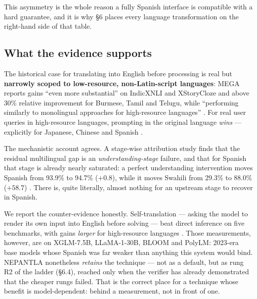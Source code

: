 This asymmetry is the whole reason a fully Spanish interface is compatible with a
hard guarantee, and it is why \S6 places every language transformation on the
right-hand side of that table.

\subsection{What the evidence supports}
\label{sec:evidence-upstream}

The historical case for translating into English before processing is real but
\textbf{narrowly scoped to low-resource, non-Latin-script languages}: MEGA
reports gains ``even more substantial'' on IndicXNLI and XStoryCloze and above
30\% relative improvement for Burmese, Tamil and Telugu, while ``performing
similarly to monolingual approaches for high-resource languages''
\citep{ahuja2023mega}. For real user queries in high-resource languages,
prompting in the original language \emph{wins} --- explicitly for Japanese,
Chinese and Spanish \citep{liu2024translationall}.

The mechanistic account agrees. A stage-wise attribution study finds that the
residual multilingual gap is an \emph{understanding-stage} failure, and that for
Spanish that stage is already nearly saturated: a perfect understanding
intervention moves Spanish from 93.9\% to 94.7\% ($+0.8$), while it moves Swahili
from 29.3\% to 88.0\% ($+58.7$) \citep{kang2026whygaps}. There is, quite
literally, almost nothing for an upstream stage to recover in Spanish.

We report the counter-evidence honestly. Self-translation --- asking the model to
render its own input into English before solving --- beat direct inference on
five benchmarks, with gains \emph{larger} for high-resource languages
\citep{etxaniz2024selftranslate}. Those measurements, however, are on
XGLM-7.5B, LLaMA-1-30B, BLOOM and PolyLM: 2023-era base models whose Spanish was
far weaker than anything this system would bind. NEPANTLA nonetheless
\emph{retains} the technique --- not as a default, but as rung R2 of the ladder
(\S6.4), reached only when the verifier has already demonstrated that the cheaper
rungs failed. That is the correct place for a technique whose benefit is
model-dependent: behind a measurement, not in front of one.
